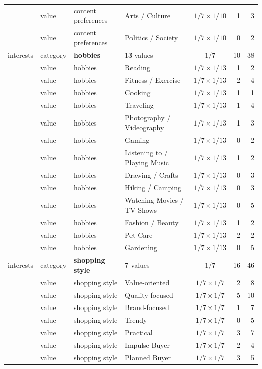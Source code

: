 \documentclass{ieeeaccess}
\begin{document}
\begin{table}[H]
\begin{tabularx}{\textwidth}{l l l X c r r}
 & value & content preferences & Arts / Culture & $1/7\times1/10$ & 1 & 3 \\
 & value & content preferences & Politics / Society & $1/7\times1/10$ & 0 & 2 \\
interests & category & \textbf{hobbies} & 13 values & $1/7$ & 10 & 38 \\
 & value & hobbies & Reading & $1/7\times1/13$ & 1 & 2 \\
 & value & hobbies & Fitness / Exercise & $1/7\times1/13$ & 2 & 4 \\
 & value & hobbies & Cooking & $1/7\times1/13$ & 1 & 1 \\
 & value & hobbies & Traveling & $1/7\times1/13$ & 1 & 4 \\
 & value & hobbies & Photography / Videography & $1/7\times1/13$ & 1 & 3 \\
 & value & hobbies & Gaming & $1/7\times1/13$ & 0 & 2 \\
 & value & hobbies & Listening to / Playing Music & $1/7\times1/13$ & 1 & 2 \\
 & value & hobbies & Drawing / Crafts & $1/7\times1/13$ & 0 & 3 \\
 & value & hobbies & Hiking / Camping & $1/7\times1/13$ & 0 & 3 \\
 & value & hobbies & Watching Movies / TV Shows & $1/7\times1/13$ & 0 & 5 \\
 & value & hobbies & Fashion / Beauty & $1/7\times1/13$ & 1 & 2 \\
 & value & hobbies & Pet Care & $1/7\times1/13$ & 2 & 2 \\
 & value & hobbies & Gardening & $1/7\times1/13$ & 0 & 5 \\
interests & category & \textbf{shopping style} & 7 values & $1/7$ & 16 & 46 \\
 & value & shopping style & Value-oriented & $1/7\times1/7$ & 2 & 8 \\
 & value & shopping style & Quality-focused & $1/7\times1/7$ & 5 & 10 \\
 & value & shopping style & Brand-focused & $1/7\times1/7$ & 1 & 7 \\
 & value & shopping style & Trendy & $1/7\times1/7$ & 0 & 5 \\
 & value & shopping style & Practical & $1/7\times1/7$ & 3 & 7 \\
 & value & shopping style & Impulse Buyer & $1/7\times1/7$ & 2 & 4 \\
 & value & shopping style & Planned Buyer & $1/7\times1/7$ & 3 & 5 \\

\end{tabularx}
\end{table}
\end{document}
